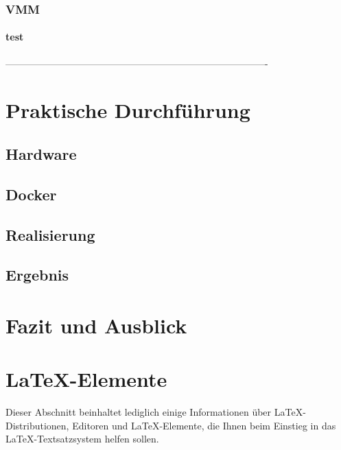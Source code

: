 \documentclass[12pt,a4paper,bibliography=totocnumbered,listof=totocnumbered]{scrartcl}
\begin{document}
\subsubsection{VMM}

\paragraph{test}

\pagebreak

 ----------------------------------------------------------------------------------
\section{Praktische Durchführung}
\subsection{Hardware}
\subsection{Docker}
\subsection{Realisierung}
\subsection{Ergebnis}


\pagebreak

\section{Fazit und Ausblick}



\pagebreak
\section{\LaTeX-Elemente}
Dieser Abschnitt beinhaltet lediglich einige Informationen über \LaTeX-Distributionen, Editoren und \LaTeX-Elemente, die Ihnen beim Einstieg in das \LaTeX-Textsatzsystem helfen sollen.
\end{document}
